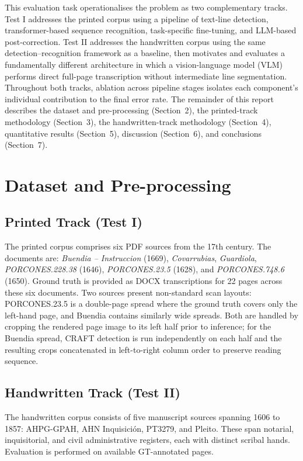 \documentclass[11pt,a4paper]{article}
\begin{document}
This evaluation task operationalises the problem as two complementary tracks. Test I addresses
the printed corpus using a pipeline of text-line detection, transformer-based sequence
recognition, task-specific fine-tuning, and LLM-based post-correction. Test II addresses the
handwritten corpus using the same detection--recognition framework as a baseline, then
motivates and evaluates a fundamentally different architecture in which a vision-language
model (VLM) performs direct full-page transcription without intermediate line segmentation.
Throughout both tracks, ablation across pipeline stages isolates each component's individual
contribution to the final error rate. The remainder of this report describes the dataset
and pre-processing (Section~2), the printed-track methodology (Section~3), the handwritten-track
methodology (Section~4), quantitative results (Section~5), discussion (Section~6), and
conclusions (Section~7).

\section{Dataset and Pre-processing}

\subsection*{Printed Track (Test I)}

The printed corpus comprises six PDF sources from the 17th century. The documents are:
\textit{Buendia -- Instruccion} (1669), \textit{Covarrubias}, \textit{Guardiola},
\textit{PORCONES.228.38} (1646), \textit{PORCONES.23.5} (1628), and \textit{PORCONES.748.6}
(1650). Ground truth is provided as DOCX transcriptions for 22 pages across these six
documents. Two sources present non-standard scan layouts: PORCONES.23.5 is a double-page
spread where the ground truth covers only the left-hand page, and Buendia contains similarly
wide spreads. Both are handled by cropping the rendered page image to its left half prior to
inference; for the Buendia spread, CRAFT detection is run independently on each half and the
resulting crops concatenated in left-to-right column order to preserve reading sequence.

\subsection*{Handwritten Track (Test II)}

The handwritten corpus consists of five manuscript sources spanning 1606 to 1857:
AHPG-GPAH, AHN Inquisici\'{o}n, PT3279, and Pleito. These span notarial, inquisitorial, and
civil administrative registers, each with distinct scribal hands. Evaluation is performed on
available GT-annotated pages.
\end{document}
